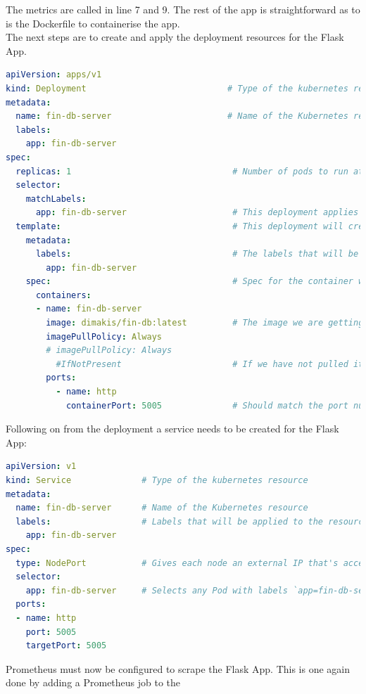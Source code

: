 The metrics are called in line 7 and 9. The rest of the app is straightforward as to is the Dockerfile to containerise the app.\\
The next steps are to create and apply the deployment resources for the Flask App.
\pagebreak
\begin{lstlisting}[language=yaml, label={flask_deployment}, caption={Deployment Resources for the Flask App}]
apiVersion: apps/v1 
kind: Deployment                            # Type of the kubernetes resource
metadata:
  name: fin-db-server                       # Name of the Kubernetes resource
  labels:
    app: fin-db-server
spec:
  replicas: 1                                # Number of pods to run at any given time
  selector:
    matchLabels: 
      app: fin-db-server                     # This deployment applies to any Pods matching the specified label
  template:                                  # This deployment will create a set of pods using the configurations in this template
    metadata:
      labels:                                # The labels that will be applied to all of the pods in this deployment
        app: fin-db-server
    spec:                                    # Spec for the container which will run in the Pod
      containers:
      - name: fin-db-server 
        image: dimakis/fin-db:latest         # The image we are getting from dockerhub
        imagePullPolicy: Always
        # imagePullPolicy: Always
          #IfNotPresent                      # If we have not pulled it before, get it from dockerhub
        ports:
          - name: http
            containerPort: 5005              # Should match the port number that the Go application listens on
\end{lstlisting}
Following on from the deployment a service needs to be created for the Flask App:
\begin{lstlisting}[language=yaml,label={flask_service_code},caption={Code for the Flask Service.}]
apiVersion: v1  
kind: Service              # Type of the kubernetes resource
metadata:
  name: fin-db-server      # Name of the Kubernetes resource
  labels:                  # Labels that will be applied to the resource
    app: fin-db-server
spec:
  type: NodePort           # Gives each node an external IP that's accessible from outside the cluster and also opens a Port.
  selector:
    app: fin-db-server     # Selects any Pod with labels `app=fin-db-server`
  ports: 
  - name: http
    port: 5005
    targetPort: 5005
\end{lstlisting}
Prometheus must now be configured to scrape the Flask App. This is one again done by adding a Prometheus job to the 

